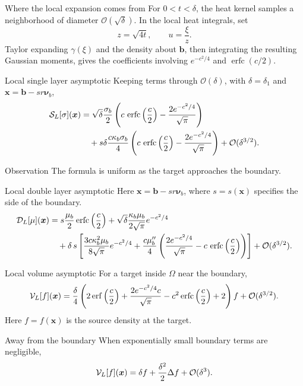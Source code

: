 \documentclass[aspectratio=169,11pt]{beamer}
\newcommand{\cO}{\mathcal{O}}
\newcommand{\x}{\bm{x}}
\newcommand{\nuvec}{\bm{\nu}}
\DeclareMathOperator{\erf}{erf}
\DeclareMathOperator{\erfc}{erfc}
\begin{document}
\begin{frame}{Where the local expansion comes from}
\small
For $0<t<\delta$, the heat kernel samples a neighborhood of diameter
$\cO(\sqrt\delta)$.  In the local heat integrals, set
\[
  z=\sqrt{4t},\qquad u=\frac{\xi}{z}.
\]
Taylor expanding $\gamma(\xi)$ and the density about $\bm b$, then integrating
the resulting Gaussian moments, gives the coefficients involving
$e^{-c^2/4}$ and $\erfc(c/2)$.
\end{frame}

\begin{frame}{Local single layer asymptotic}
\small
Keeping terms through $\cO(\delta)$, with $\delta=\delta_1$ and
$\x=\bm b-sr\nuvec_b$,
\[
\begin{aligned}
\Sop_L[\sigma](\x)
&=
\sqrt{\delta}\frac{\sigma_b}{2}
\left(
c\,\erfc\left(\frac c2\right)
-
\frac{2e^{-c^2/4}}{\sqrt\pi}
\right)\\
&\quad+
s\delta\frac{c\kappa_b\sigma_b}{4}
\left(
c\,\erfc\left(\frac c2\right)
-
\frac{2e^{-c^2/4}}{\sqrt\pi}
\right)
+\cO(\delta^{3/2}).
\end{aligned}
\]

\begin{block}{Observation}
The formula is uniform as the target approaches the boundary.
\end{block}
\end{frame}

\begin{frame}{Local double layer asymptotic}
\scriptsize
Here $\x=\bm b-sr\nuvec_b$, where $s=s(\x)$ specifies the side of the
boundary.
\[
\begin{aligned}
\Dop_L[\mu](\x)
&=
s\frac{\mu_b}{2}
\erfc\left(\frac c2\right)
+\sqrt{\delta}\frac{\kappa_b\mu_b}{2\sqrt\pi}e^{-c^2/4}\\
&\quad+
\delta\,s
\left[
\frac{3c\kappa_b^2\mu_b}{8\sqrt\pi}e^{-c^2/4}
+
\frac{c\mu_b''}{4}
\left(
\frac{2e^{-c^2/4}}{\sqrt\pi}
-
c\,\erfc\left(\frac c2\right)
\right)
\right]
+\cO(\delta^{3/2}).
\end{aligned}
\]

\end{frame}

\begin{frame}{Local volume asymptotic}
\small
For a target inside $\Omega$ near the boundary,
\[
  \Vop_L[f](\x)
  =
  \frac{\delta}{4}
  \left(
  2\erf\left(\frac c2\right)
  +
  \frac{2e^{-c^2/4}c}{\sqrt\pi}
  -
  c^2\erfc\left(\frac c2\right)
  +2
  \right)f
  +
  \cO(\delta^{3/2}).
\]
Here $f=f(\x)$ is the source density at the target.

\begin{block}{Away from the boundary}
When exponentially small boundary terms are negligible,
\[
  \Vop_L[f](\x)=\delta f+\frac{\delta^2}{2}\Delta f+\cO(\delta^3).
\]
\end{block}
\end{frame}
\end{document}
